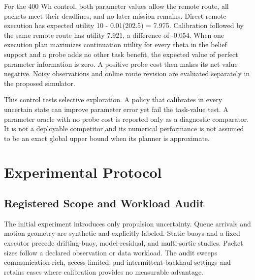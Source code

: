 \documentclass[10pt,twocolumn,letterpaper]{article}
\begin{document}
For the 400 Wh control, both parameter values allow the remote route, all packets meet their deadlines, and no later mission remains. Direct remote execution has expected utility 10 - 0.01(202.5) = 7.975. Calibration followed by the same remote route has utility 7.921, a difference of -0.054. When one execution plan maximizes continuation utility for every theta in the belief support and a probe adds no other task benefit, the expected value of perfect parameter information is zero. A positive probe cost then makes its net value negative. Noisy observations and online route revision are evaluated separately in the proposed simulator.

This control tests selective exploration. A policy that calibrates in every uncertain state can improve parameter error yet fail the task-value test. A parameter oracle with no probe cost is reported only as a diagnostic comparator. It is not a deployable competitor and its numerical performance is not assumed to be an exact global upper bound when its planner is approximate.

\section{Experimental Protocol}
\subsection{Registered Scope and Workload Audit}
The initial experiment introduces only propulsion uncertainty. Queue arrivals and motion geometry are synthetic and explicitly labeled. Static buoys and a fixed executor precede drifting-buoy, model-residual, and multi-sortie studies. Packet sizes follow a declared observation or data workload. The audit sweeps communication-rich, access-limited, and intermittent-backhaul settings and retains cases where calibration provides no measurable advantage.
\end{document}
